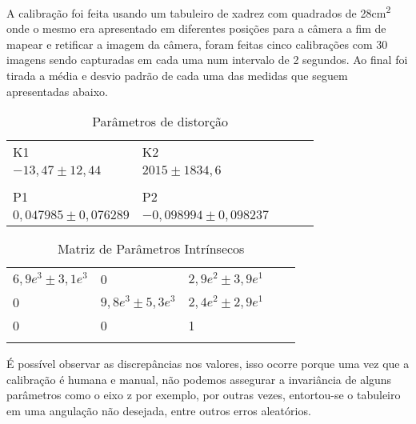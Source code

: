 \documentclass[conference,harvard,brazil,english]{sbatex}
\begin{document}
		 \par A calibração foi feita usando um tabuleiro de xadrez com quadrados de 28cm\textsuperscript{2} onde o mesmo era apresentado em diferentes posições para a câmera a fim de mapear e retificar a imagem da câmera, foram feitas cinco calibrações com 30 imagens sendo capturadas em cada uma num intervalo de 2 segundos. Ao final foi tirada a média e desvio padrão de cada uma das medidas que seguem apresentadas abaixo.
		 \begin{table}[h]
		 	\centering
		 	\caption{Parâmetros de distorção}
		 	\label{Distorção}
		 	\begin{tabular}{lllll}
		 		\\K1               & K2                 &  &  &  \\
		 		$ -13,47\pm12,44 $    & $ 2015\pm1834,6 $      &  &  &  \\\\
		 		P1                 & P2                 &  &  &  \\
		 		$ 0,047985\pm0,076289 $ & $ -0,098994\pm0,098237  $&  &  & 
		 	\end{tabular}
		 \end{table}
		 \begin{table}[h]
		 	\centering
		 	\caption{Matriz de Parâmetros Intrínsecos}
		 	\label{my-label}
		 	\begin{tabular}{lllll}
		 		\\ $6,9e^{3}\pm3,1e^{3} $ & 0                & $ 2,9e^{2}\pm3,9e^{1} $     &  &  \\
		 		0                & $ 9,8e^{3}\pm5,3e^{3} $ & $ 2,4e^{2}\pm2,9e^{1} $ &  &  \\
		 		0                & 0                & 1                       &  &  \\
		 		&                  &                         &  & 
		 	\end{tabular}
		 \end{table} 
		\pagebreak
		\par É possível observar as discrepâncias nos valores, isso ocorre porque uma vez que a calibração é humana e manual, não podemos assegurar a invariância de alguns parâmetros como o eixo z por exemplo, por outras vezes, entortou-se o tabuleiro em uma angulação não desejada, entre outros erros aleatórios.
		
\end{document}
